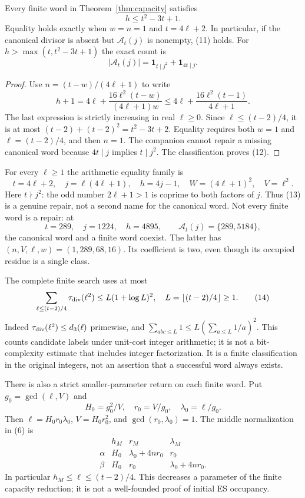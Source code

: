 \begin{theorem}\label{thm:bound}
Every finite word in Theorem~\ref{thm:capacity} satisfies
\[
 \boxed{h\le t^2-3t+1.}                                \tag{11}
\]
Equality holds exactly when $w=n=1$ and $t=4\ell+2$. In particular, if the
canonical divisor is absent but $\mathcal A_t(j)$ is nonempty, (11) holds.
For $h>\max(t,t^2-3t+1)$ the exact count is
\[
 \boxed{|\mathcal A_t(j)|=
  \mathbf1_{t\mid j^2}+\mathbf1_{4t\mid j}.}             \tag{12}
\]
\end{theorem}
\begin{proof}
Use $n=(t-w)/(4\ell+1)$ to write
\[
 h+1=4\ell+\frac{16\ell^2(t-w)}{(4\ell+1)w}
 \le4\ell+\frac{16\ell^2(t-1)}{4\ell+1}.
\]
The last expression is strictly increasing in real $\ell\ge0$. Since
$\ell\le(t-2)/4$, it is at most
$(t-2)+(t-2)^2=t^2-3t+2$. Equality requires both $w=1$ and
$\ell=(t-2)/4$, and then $n=1$. The companion cannot repair a missing canonical
word because $4t\mid j$ implies $t\mid j^2$. The classification proves (12).
\end{proof}

For every $\ell\ge1$ the arithmetic equality family is
\[
 t=4\ell+2,\quad j=\ell(4\ell+1),\quad h=4j-1,
 \quad W=(4\ell+1)^2,\quad V=\ell^2.                    \tag{13}
\]
Here $t\nmid j^2$: the odd number $2\ell+1>1$ is coprime to both factors of
$j$. Thus (13) is a genuine repair, not a second name for the canonical word.
Not every finite word is a repair: at
\[
 t=289,\quad j=1224,\quad h=4895,
 \qquad\mathcal A_t(j)=\{289,5184\},
\]
the canonical word and a finite word coexist. The latter has
$(n,V,\ell,w)=(1,289,68,16)$. Its coefficient is two, even though its occupied
residue is a single class.

The complete finite search uses at most
\[
 \sum_{\ell\le(t-2)/4}\tau_{\rm div}(\ell^2)
 \le L(1+\log L)^2,\quad L=\lfloor(t-2)/4\rfloor\ge1.   \tag{14}
\]
Indeed $\tau_{\rm div}(\ell^2)\le d_3(\ell)$ primewise, and
$\sum_{abc\le L}1\le L(\sum_{a\le L}1/a)^2$.  This counts candidate labels
under unit-cost integer arithmetic; it is not a bit-complexity estimate that
includes integer factorization.  It is a finite classification in the original
integers, not an assertion that a successful word always exists.

There is also a strict smaller-parameter return on each finite word. Put
$g_0=\gcd(\ell,V)$ and
\[
 H_0=g_0^2/V,\quad r_0=V/g_0,\quad \lambda_0=\ell/g_0.
\]
Then $\ell=H_0r_0\lambda_0$, $V=H_0r_0^2$, and $\gcd(r_0,\lambda_0)=1$.
The middle normalization in (6) is
\[
 \begin{array}{c|ccc}
 &h_M&r_M&\lambda_M\\\hline
 \alpha&H_0&\lambda_0+4nr_0&r_0\\
 \beta&H_0&r_0&\lambda_0+4nr_0.
 \end{array}                                           \tag{15}
\]
In particular $h_M\le\ell\le(t-2)/4$. This decreases a parameter of the
finite capacity reduction; it is not a well-founded proof of initial ES occupancy.

